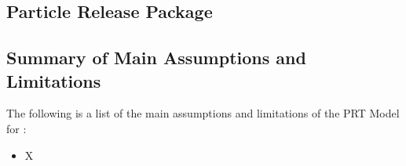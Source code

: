 

\subsection{Particle Release Package} \label{sec:prp}


\subsection{Summary of Main Assumptions and Limitations}

The following is a list of the main assumptions and limitations of the PRT Model for \mf:

\begin{itemize}
\item X
\end{itemize}
